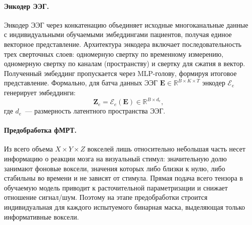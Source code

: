 \paragraph{Энкодер ЭЭГ.}
Энкодер ЭЭГ через конкатенацию объединяет исходные многоканальные данные с индивидуальными обучаемыми эмбеддингами пациентов, получая единое векторное представление. Архитектура энкодера включает последовательность трех сверточных слоев: одномерную свертку по временному измерению, одномерную свертку по каналам (пространству) и свертку для сжатия в вектор. Полученный эмбеддинг пропускается через MLP-голову, формируя итоговое представление. Формально, для батча данных ЭЭГ $\mathbf{E} \in \mathbb{R}^{B \times K \times T}$ энкодер $\mathcal{E}_{e}$ генерирует эмбеддинги:
\begin{equation*}
\mathbf{Z}_{e} = \mathcal{E}_{e}(\mathbf{E}) \in \mathbb{R}^{B \times d_{e}},
\end{equation*}
где $d_{e}$~--- размерность латентного пространства ЭЭГ.

\paragraph{Предобработка фМРТ.}
Из всего объема $X \times Y \times Z$ вокселей лишь относительно небольшая часть несет информацию о реакции мозга на визуальный стимул: значительную долю занимают фоновые воксели, значения которых либо близки к нулю, либо стабильны во времени и не зависят от стимула. Прямая подача всего тензора в обучаемую модель приводит к расточительной параметризации и снижает отношение сигнал/шум. Поэтому на этапе предобработки строится индивидуальная для каждого испытуемого бинарная маска, выделяющая только информативные воксели.


